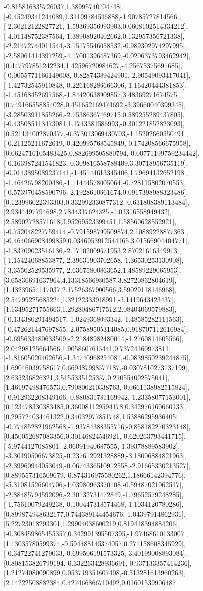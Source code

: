 \documentclass{article}
\begin{document}
-0.815816835726037,1.38995740704748],[-0.45249341244089,1.31199784546888,-1.90785727814566],[-2.30212122827721,-1.59369356993903,0.0608102514334212],[-4.01148752387564,-1.38908920402662,0.132957356721338],[-2.21472744011544,-3.15175546058532,-0.989302974297995],[-2.58061414397259,-4.17001396487369,-0.0206373793462942],[0.447797851242234,1.42596720984627,-4.25675375691685],[-0.0055771166149008,-0.82874389424901,-2.90549093417041],[-1.42732545910848,-0.226168286666306,-1.16420444381853],[-1.45168452697568,-1.84420638909857,3.48369271674575],[0.749166558854028,0.451652169474692,-3.39660040399345],[-3.28503911855266,-2.75386367469715,0.589255289437805],[-0.435085113473081,1.1743381586993,-0.301221852823093],[0.521134002870377,-0.373013069430703,-1.15202660550491],[-0.21125211672619,-0.420995768545849,-0.174208566675958],[0.0624716105483425,0.882699505880794,-0.00771199759234442],[-0.163987241541823,-0.309816558788409,3.30718956735119],[-0.0143895089237141,-1.45144613345406,1.79694132652198],[-1.46426798200486,-1.11444578005064,-0.728115802070553],[-0.573970458590796,-2.1928610661674,0.0917398988323486],[0.123996022393303,0.332992330877312,-0.631808389113484],[2.9344497794698,2.7844317624325,-1.03316558949432],[2.58902728571618,3.95269523399451,1.58560628552921],[-0.752048227759414,-0.791598799509874,2.10889228877363],[-0.464066908499859,0.0346953912544165,3.01566904404771],[-1.83709023516136,-2.17102009671953,2.87021616349913],[-1.15424068853877,-2.39631903702658,-1.36530253130908],[-3.35502529535977,-2.63675800863652,1.48589229065953],[3.65836691637964,4.13318566980587,3.82720862804619],[1.43239654117037,2.17526367900566,3.59029118146968],[2.54799225685224,1.32122333918991,-3.1419643423437],[1.13495271755663,1.29280486717512,2.08404069579883],[-0.134380291494517,-1.0249368093342,-1.48585282111563],[-0.472621447697855,-2.07589505314085,0.918707112616984],[-0.695633480633509,-2.21848982480014,-1.2760814605566],[2.04298125664566,1.9058607615441,0.73724160973811],[-1.81605020402656,-1.34740968254081,-0.0839850239244875],[1.69046039758617,0.669487998577187,-0.0307810273137199],[2.635236826321,3.5155335125357,0.210554002575041],[1.46197498476573,0.790800210338763,-0.0661138982515824],[-0.912932208349166,-0.880831781169942,-1.23358077153001],[0.123478330383485,0.360081129594178,0.342976160660133],[0.295724034461322,0.34032977851748,1.53886295936405],[-0.774852821962568,-1.93784388355716,-0.858182270323148],[0.450052687083356,0.30146824546921,-0.620263793441715],[-5.9744127085801,-2.06091940687555,-1.39378889583902],[-3.30190506673825,-0.237612921328889,-3.18006884821963],[-2.39960944053049,-0.0674336510912558,-2.91665330213527],[0.889557316509679,-0.874316975580262,1.18666142394776],[-5.31081526604706,-1.03980963370108,-0.59487021062517],[-2.88485794592096,-2.30132731472849,-1.79652579248285],[-1.75610079249238,-0.100447318574468,-1.1034120780286],[0.899874948632177,0.744389144454676,-1.04397914862931],[5.22723018293301,1.29904038600219,0.819418394884206],[-0.308459865455357,0.342991395507395,-1.97468610133007],[1.13035780599374,-0.594488145374057,0.271158608345929],[-0.34722741279033,-0.699506191573325,-3.40199008893084],[0.808153826799194,-0.332263428936691,-0.937133357414236],[1.21274080090899,0.053719351607408,-0.513281613960263],[2.14222508882384,0.427466866710492,0.01601539906487
\end{document}
